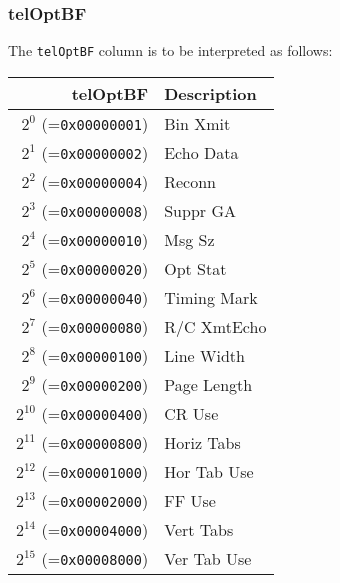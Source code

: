 \documentclass[documentation]{subfiles}
\begin{document}
\subsubsection{telOptBF}\label{telOptBF}
The {\tt telOptBF} column is to be interpreted as follows:\\
\begin{minipage}{0.49\textwidth}
    \begin{longtable}{rl}
        \toprule
        {\bf telOptBF} & {\bf Description} \\
        \midrule\endhead%
        $2^{0}$  (={\tt 0x00000001}) & Bin Xmit\\
        $2^{1}$  (={\tt 0x00000002}) & Echo Data\\
        $2^{2}$  (={\tt 0x00000004}) & Reconn\\
        $2^{3}$  (={\tt 0x00000008}) & Suppr GA\\
        $2^{4}$  (={\tt 0x00000010}) & Msg Sz\\
        $2^{5}$  (={\tt 0x00000020}) & Opt Stat\\
        $2^{6}$  (={\tt 0x00000040}) & Timing Mark\\
        $2^{7}$  (={\tt 0x00000080}) & R/C XmtEcho\\
        $2^{8}$  (={\tt 0x00000100}) & Line Width\\
        $2^{9}$  (={\tt 0x00000200}) & Page Length\\
        $2^{10}$ (={\tt 0x00000400}) & CR Use\\
        $2^{11}$ (={\tt 0x00000800}) & Horiz Tabs\\
        $2^{12}$ (={\tt 0x00001000}) & Hor Tab Use\\
        $2^{13}$ (={\tt 0x00002000}) & FF Use\\
        $2^{14}$ (={\tt 0x00004000}) & Vert Tabs\\
        $2^{15}$ (={\tt 0x00008000}) & Ver Tab Use\\
        \bottomrule
    \end{longtable}
\end{minipage}
\hfill
\end{document}
